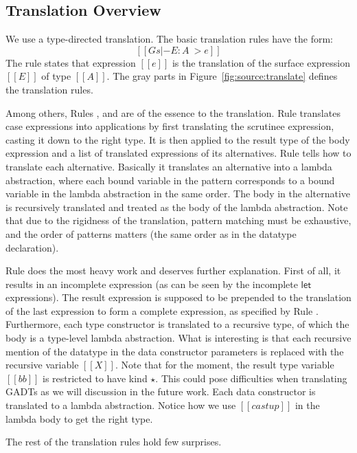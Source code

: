 \subsection{Translation Overview}

We use a type-directed translation. The basic translation rules have the form:
\[
[[Gs  |- E : A ~> e]]
\]
The rule states that \name expression $[[e]]$ is the translation of the
surface expression $[[E]]$ of type $[[A]]$.  The gray parts in
Figure~\ref{fig:source:translate} defines the translation
rules. 

Among others, Rules ,  and
 are of the essence to the translation. Rule
 translates case expressions into applications by
first translating the scrutinee expression, casting it down to the
right type. It is then applied to the result type of the body
expression and a list of translated \name expressions of its
alternatives. Rule  tells how to translate each
alternative. Basically it translates an alternative into a lambda
abstraction, where each bound variable in the pattern corresponds to a
bound variable in the lambda abstraction in the same order. The body
in the alternative is recursively translated and treated as the body
of the lambda abstraction. Note that due to the rigidness of the
translation, pattern matching must be exhaustive, and the order of
patterns matters (the same order as in the datatype declaration).

Rule  does the most heavy work and deserves
further explanation. First of all, it results in an incomplete
expression (as can be seen by the incomplete $\mathsf{let}$
expressions). The result expression is supposed to be prepended to the
translation of the last expression to form a complete \name
expression, as specified by Rule . Furthermore,
each type constructor is translated to a recursive type, of which the
body is a type-level lambda abstraction. What is interesting is that
each recursive mention of the datatype in the data constructor
parameters is replaced with the recursive variable $[[X]]$. Note that
for the moment, the result type variable $[[bb]]$ is restricted to
have kind $\star$. This could pose difficulties when translating GADTs
as we will discussion in the future work. Each data constructor is
translated to a lambda abstraction. Notice how we use $[[castup]]$ in
the lambda body to get the right type.

The rest of the translation rules hold few surprises.

